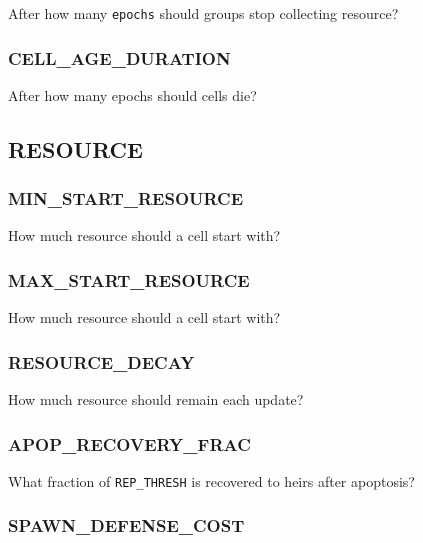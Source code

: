 
After how many \texttt{epochs} should groups stop collecting resource?

\subsubsection{CELL\_AGE\_DURATION}


After how many epochs should cells die?


\subsection{RESOURCE}


\subsubsection{MIN\_START\_RESOURCE}


How much resource should a cell start with?

\subsubsection{MAX\_START\_RESOURCE}


How much resource should a cell start with?

\subsubsection{RESOURCE\_DECAY}


How much resource should remain each update?

\subsubsection{APOP\_RECOVERY\_FRAC}


What fraction of \texttt{REP\_THRESH} is recovered to heirs after apoptosis?

\subsubsection{SPAWN\_DEFENSE\_COST}

